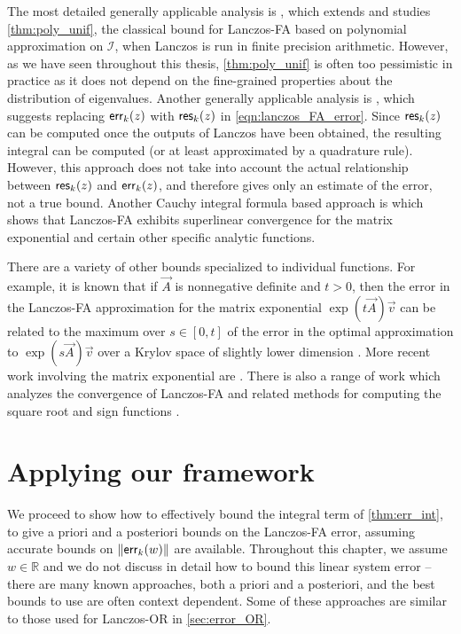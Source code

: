 The most detailed generally applicable analysis is \cite{musco_musco_sidford_18}, which extends \cite{druskin_knizhnerman_91,druskin_knizhnerman_95} and studies \cref{thm:poly_unif}, the classical bound for Lanczos-FA based on polynomial approximation on \( \mathcal{I} \), when Lanczos is run in finite precision arithmetic.
However, as we have seen throughout this thesis, \cref{thm:poly_unif} is often too pessimistic in practice as it does not depend on the fine-grained properties about the distribution of eigenvalues.
Another generally applicable analysis is \cite{hochbruck_lubich_selhofer_98}, which suggests replacing \( \textup{\textsf{err}}_k(z) \) with \( \textup{\textsf{res}}_k(z) \) in \cref{eqn:lanczos_FA_error}.
Since \( \textup{\textsf{res}}_k(z) \) can be computed once the outputs of Lanczos have been obtained, the resulting integral can be computed (or at least approximated by a quadrature rule).
However, this approach does not take into account the actual relationship between \( \textup{\textsf{res}}_k(z) \) and \( \textup{\textsf{err}}_k(z) \), and therefore gives only an estimate of the error, not a true bound.
Another Cauchy integral formula based approach is \cite{hochbruck_lubich_97} which shows that Lanczos-FA exhibits superlinear convergence for the matrix exponential and certain other specific analytic functions.

There are a variety of other bounds specialized to individual functions.
For example, it is known that if \( \vec{A} \) is nonnegative definite and \( t > 0 \), then the error in the Lanczos-FA approximation for the matrix exponential \( \exp( t \vec{A}) \vec{v} \) can be related to the maximum over \( s \in [0,t] \) of the error in the  optimal approximation to \( \exp( s \vec{A}) \vec{v} \) over a Krylov space of slightly lower dimension \cite{druskin_greenbaum_knizhnerman_98}.
More recent work involving the matrix exponential are \cite{jia_lv_14,jawecki_auzinger_koch_19,jawecki_21}.
There is also a range of work which analyzes the convergence of Lanczos-FA and related methods for computing the square root and sign functions \cite{boricci_99,borici_03,eshof_frommer_lippert_schilling_van_der_vorst_02}.

\section{Applying our framework}
\label{sec:cif_results}

We proceed to show how to effectively bound the integral term of \cref{thm:err_int}, to give  a priori and a posteriori  bounds on the Lanczos-FA error, assuming accurate bounds on \( \| \textup{\textsf{err}}_k(w) \| \) are available.
Throughout this chapter, we assume $w\in\mathbb{R}$ and we do not discuss in detail how to bound this linear system error  -- there are many known approaches, both a priori and a posteriori, and the best bounds to use are often context dependent. 
Some of these approaches are similar to those used for Lanczos-OR in \cref{sec:error_OR}.


